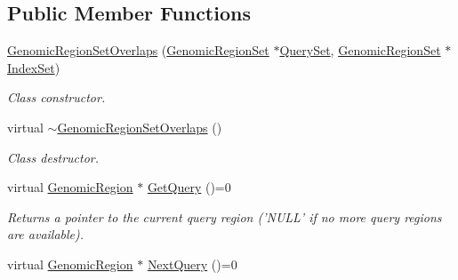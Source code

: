 \subsection*{Public Member Functions}
\begin{CompactItemize}
\item 
\hyperlink{classGenomicRegionSetOverlaps_67c96149c0881747110db61e76f8c5de}{GenomicRegionSetOverlaps} (\hyperlink{classGenomicRegionSet}{GenomicRegionSet} $\ast$\hyperlink{classGenomicRegionSetOverlaps_e513304379055f6d379bc5907733dbe2}{QuerySet}, \hyperlink{classGenomicRegionSet}{GenomicRegionSet} $\ast$\hyperlink{classGenomicRegionSetOverlaps_c587bf854c827381493735b473622e03}{IndexSet})
\begin{CompactList}\small\item\em Class constructor. \item\end{CompactList}\item 
\hypertarget{classGenomicRegionSetOverlaps_6d9f677e16839c931657c0200b56d99e}{
virtual \hyperlink{classGenomicRegionSetOverlaps_6d9f677e16839c931657c0200b56d99e}{$\sim$GenomicRegionSetOverlaps} ()}
\label{classGenomicRegionSetOverlaps_6d9f677e16839c931657c0200b56d99e}

\begin{CompactList}\small\item\em Class destructor. \item\end{CompactList}\item 
\hypertarget{classGenomicRegionSetOverlaps_709ccfbe8c41154eaf590ca5aa9e12c5}{
virtual \hyperlink{classGenomicRegion}{GenomicRegion} $\ast$ \hyperlink{classGenomicRegionSetOverlaps_709ccfbe8c41154eaf590ca5aa9e12c5}{GetQuery} ()=0}
\label{classGenomicRegionSetOverlaps_709ccfbe8c41154eaf590ca5aa9e12c5}

\begin{CompactList}\small\item\em Returns a pointer to the current query region ('NULL' if no more query regions are available). \item\end{CompactList}\item 
\hypertarget{classGenomicRegionSetOverlaps_21900a952fc925e5bc1840aff106a887}{
virtual \hyperlink{classGenomicRegion}{GenomicRegion} $\ast$ \hyperlink{classGenomicRegionSetOverlaps_21900a952fc925e5bc1840aff106a887}{NextQuery} ()=0}
\label{classGenomicRegionSetOverlaps_21900a952fc925e5bc1840aff106a887}


\end{CompactItemize}
